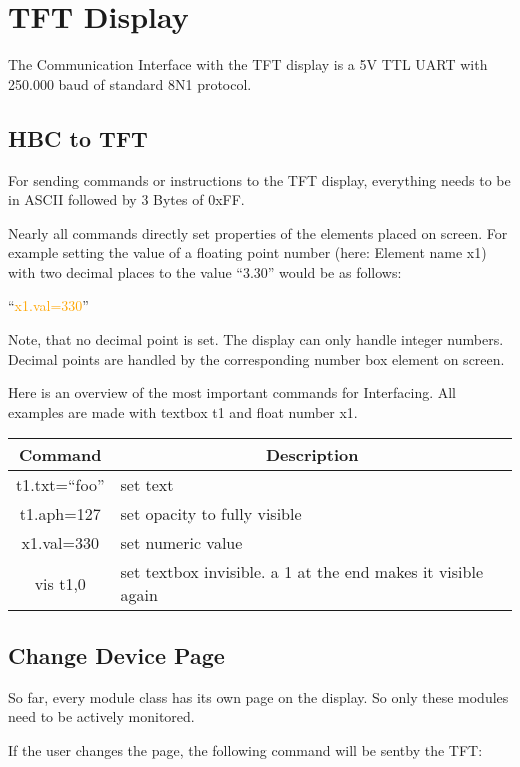 \section{TFT Display}
The Communication Interface with the TFT display is a 5V TTL UART with 250.000 baud of standard 8N1 protocol.

\subsection{HBC to TFT}
For sending commands or instructions to the TFT display, everything needs to be in ASCII followed by 3 Bytes of 0xFF. 

Nearly all commands directly set properties of the elements placed on screen. For example setting the value of a floating point number (here: Element name x1) with two decimal places to the value ``3.30'' would be as follows:

``\textcolor{orange}{x1.val=330}''

Note, that no decimal point is set. The display can only handle integer numbers. Decimal points are handled by the corresponding number box element on screen. 

Here is an overview of the most important commands for Interfacing. All examples are made with textbox t1 and float number x1.

\begin{table}[H]
    \centering
    \begin{tabular}{|c|l|}
        \hline
        \textbf{Command}  & \multicolumn{1}{|c|}{\textbf{Description}}\\ \hline \hline
        t1.txt=``foo'' & set text \\ \hline
        t1.aph=127 & set opacity to fully visible \\ \hline
        x1.val=330 & set numeric value \\ \hline
        vis t1,0 & set textbox invisible. a 1 at the end makes it visible again \\ \hline
    \end{tabular}
\label{tab:tft_overview}
\end{table}

\subsection{Change Device Page}
So far, every module class has its own page on the display. So only these modules need to be actively monitored. 

If the user changes the page, the following command will be sentby the TFT: 

